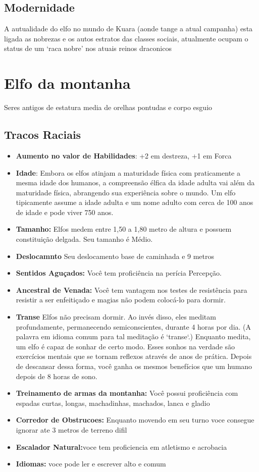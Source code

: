 \documentclass{book}
\begin{document}
\section{Modernidade}
A autualidade do elfo no mundo de Kuara (aonde tange a atual campanha) esta ligada as nobrezas 
e os autos estratos das classes sociais, atualmente ocupam o status de um `raca nobre' nos 
atuais reinos draconicos 

\chapter{Elfo da montanha}
    Seres antigos de estatura media de orelhas pontudas e corpo esguio
\section{Tracos Raciais}
\begin{itemize}
    \item \textbf{Aumento no valor de Habilidades}: +2 em destreza, +1 em Forca
    \item \textbf{Idade}: Embora os elfos atinjam a maturidade física com praticamente a mesma 
          idade dos humanos, a compreensão élfica da idade adulta vai além da maturidade 
          física, abrangendo sua experiência sobre o mundo. Um elfo tipicamente assume 
          a idade adulta e um nome adulto com cerca de 100 anos de idade e pode viver
          750 anos.
    \item \textbf{Tamanho:} Elfos medem entre 1,50 a 1,80 metro de altura e possuem 
          constituição delgada. Seu tamanho é Médio.
    \item \textbf{Deslocamnto} Seu deslocamento base de caminhada e 9 metros
       \item \textbf{Sentidos Aguçados:} Você tem proficiência na perícia Percepção.
    \item \textbf{Ancestral de Venada:} Você tem vantagem nos testes de resistência para 
          resistir  a ser enfeitiçado e magias não podem colocá-lo para dormir.
    \item \textbf{Transe} Elfos não precisam dormir. Ao invés disso, eles meditam 
          profundamente, permanecendo semiconscientes, durante 4 horas por 
          dia. (A palavra em idioma comum para tal meditação é `transe`.) Enquanto
          medita, um elfo é capaz de sonhar de certo modo. Esses sonhos na verdade 
          são exercícios mentais que se tornam reflexos através de anos de prática.
          Depois de descansar dessa forma, você ganha os mesmos benefícios que um
          humano depois de 8 horas de sono.
    \item \textbf{Treinamento de armas da montanha:} Você possui proficiência com espadas 
          curtas, longas, machadinhas, machados, lanca e gladio
    \item \textbf{Corredor de Obstrucoes:} Enquanto movendo em seu turno voce consegue ignorar 
          ate 3 metros de terreno difil

    \item \textbf{Escalador Natural:}voce tem proficiencia em atletismo e acrobacia
    \item \textbf{Idiomas:} voce pode ler e escrever alto e comum 
\end{itemize}
\end{document}
